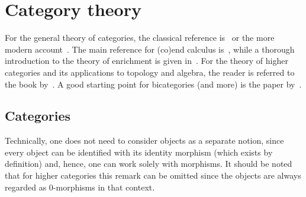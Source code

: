 \chapter{Category theory}\label{chapter:cat}

    For the general theory of categories, the classical reference is~\citet{mac_lane_categories_2013} or the more modern account~\citet{riehl_category_2017}. The main reference for (co)end calculus is~\citet{loregian_coend_2021}, while a thorough introduction to the theory of enrichment is given in~\citet{kelly_basic_1982}. For the theory of higher categories and its applications to topology and algebra, the reader is referred to the book by~\citet{baez_towards_2009}. A good starting point for bicategories (and more) is the paper by~\citet{leinster_basic_1998}.

    \minitoc

\section{Categories}

    \begin{remark}
        Technically, one does not need to consider objects as a separate notion, since every object can be identified with its identity morphism (which exists by definition) and, hence, one can work solely with morphisms. It should be noted that for higher categories this remark can be omitted since the objects are always regarded as 0-morphisms in that context.
    \end{remark}

